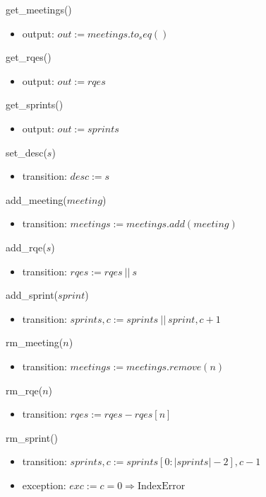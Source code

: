 \documentclass[12pt, titlepage]{article}
\begin{document}
\noindent get\_meetings()
\begin{itemize}
    \item output: $out := meetings.to_seq()$
\end{itemize}

\noindent get\_rqes()
\begin{itemize}
    \item output: $out := rqes$
\end{itemize}

\noindent get\_sprints()
\begin{itemize}
    \item output: $out := sprints$
\end{itemize}

\noindent set\_desc($s$)
\begin{itemize}
    \item transition: $desc := s$
\end{itemize}

\noindent add\_meeting($meeting$)
\begin{itemize}
    \item transition: $meetings := meetings.add(meeting)$
\end{itemize}

\noindent add\_rqe($s$)
\begin{itemize}
    \item transition: $rqes := rqes\ ||\ s$
\end{itemize}

\noindent add\_sprint($sprint$)
\begin{itemize}
    \item transition: $sprints, c := sprints\ ||\ sprint, c + 1$
\end{itemize}

\noindent rm\_meeting($n$)
\begin{itemize}
    \item transition: $meetings := meetings.remove(n)$
\end{itemize}

\noindent rm\_rqe($n$)
\begin{itemize}
    \item transition: $rqes := rqes - rqes[n]$
\end{itemize}

\noindent rm\_sprint()
\begin{itemize}
    \item transition: $sprints, c := sprints[0: |sprints| - 2], c - 1$
    \item exception: $exc := c = 0 \Rightarrow \text{IndexError}$
\end{itemize}
\end{document}

